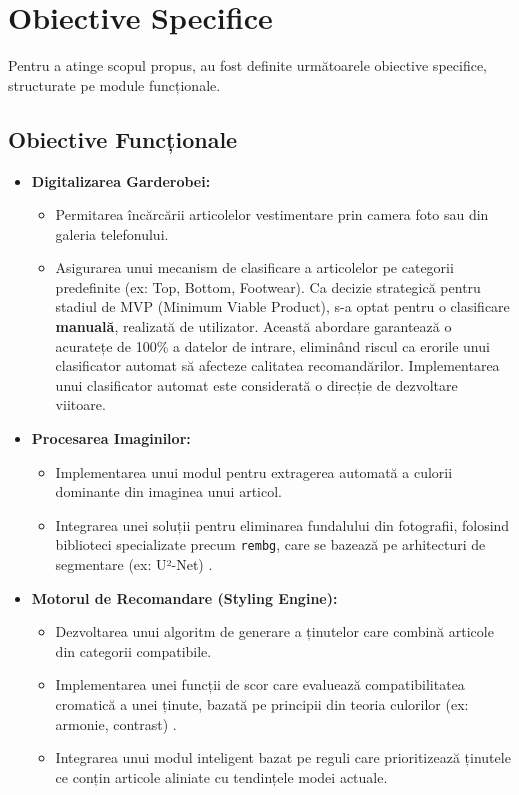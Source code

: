 \section{Obiective Specifice}

Pentru a atinge scopul propus, au fost definite următoarele obiective specifice, structurate pe module funcționale.

\subsection{Obiective Funcționale}

\begin{itemize}
    \item \textbf{Digitalizarea Garderobei:}
        \begin{itemize}
            \item Permitarea încărcării articolelor vestimentare prin camera foto sau din galeria telefonului.
            \item Asigurarea unui mecanism de clasificare a articolelor pe categorii predefinite (ex: Top, Bottom, Footwear). Ca decizie strategică pentru stadiul de MVP (Minimum Viable Product), s-a optat pentru o clasificare \textbf{manuală}, realizată de utilizator. Această abordare garantează o acuratețe de 100\% a datelor de intrare, eliminând riscul ca erorile unui clasificator automat să afecteze calitatea recomandărilor. Implementarea unui clasificator automat este considerată o direcție de dezvoltare viitoare.
        \end{itemize}
    
    \item \textbf{Procesarea Imaginilor:}
        \begin{itemize}
            \item Implementarea unui modul pentru extragerea automată a culorii dominante din imaginea unui articol.
            \item Integrarea unei soluții pentru eliminarea fundalului din fotografii, folosind biblioteci specializate precum \texttt{rembg}, care se bazează pe arhitecturi de segmentare (ex: U²-Net) \cite{rembg_repo}.
        \end{itemize}

    \item \textbf{Motorul de Recomandare (Styling Engine):}
        \begin{itemize}
            \item Dezvoltarea unui algoritm de generare a ținutelor care combină articole din categorii compatibile.
            \item Implementarea unei funcții de scor care evaluează compatibilitatea cromatică a unei ținute, bazată pe principii din teoria culorilor (ex: armonie, contrast) \cite{color_theory_design}.
            \item Integrarea unui modul inteligent bazat pe reguli care prioritizează ținutele ce conțin articole aliniate cu tendințele modei actuale.
        \end{itemize}


\end{itemize}
